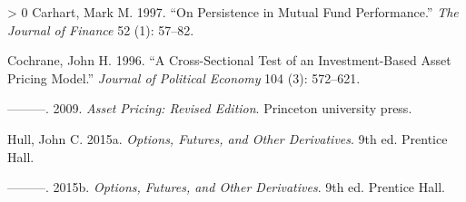 \documentclass[12pt,halfline,a4paper,]{ouparticle}
\newlength{\cslhangindent}
\newenvironment{CSLReferences}[3] %
 {%
  \setlength{\parindent}{0pt}
  \ifodd #1 \everypar{\setlength{\hangindent}{\cslhangindent}}\ignorespaces\fi
  \ifnum #2 > 0
  \setlength{\parskip}{#2\baselineskip}
  \fi
 }%
 {}
\begin{document}
\hypertarget{refs}{}
\begin{CSLReferences}{1}{0}
\leavevmode\hypertarget{ref-carhart1997persistence}{}%
Carhart, Mark M. 1997. {``On Persistence in Mutual Fund Performance.''}
\emph{The Journal of Finance} 52 (1): 57--82.

\leavevmode\hypertarget{ref-cochrane1996cross}{}%
Cochrane, John H. 1996. {``A Cross-Sectional Test of an Investment-Based
Asset Pricing Model.''} \emph{Journal of Political Economy} 104 (3):
572--621.

\leavevmode\hypertarget{ref-cochrane2009asset}{}%
---------. 2009. \emph{Asset Pricing: Revised Edition}. Princeton
university press.

\leavevmode\hypertarget{ref-Hull}{}%
Hull, John C. 2015a. \emph{Options, Futures, and Other Derivatives}. 9th
ed. Prentice Hall.

\leavevmode\hypertarget{ref-Hull2}{}%
---------. 2015b. \emph{Options, Futures, and Other Derivatives}. 9th
ed. Prentice Hall.

\end{CSLReferences}
\end{document}
